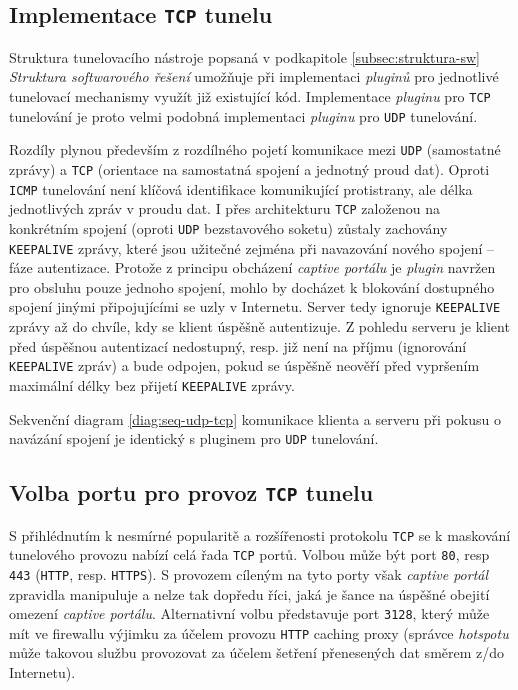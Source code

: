 \documentclass[thesis=M,czech]{FITthesis}[2012/10/20]
\begin{document}
    
    \subsection{Implementace \texttt{TCP} tunelu}
    
    Struktura tunelovacího nástroje popsaná v podkapitole \ref{subsec:struktura-sw} \textit{Struktura softwarového řešení} umožňuje při implementaci \textit{pluginů} pro jednotlivé tunelovací mechanismy využít již existující kód. Implementace \textit{pluginu} pro \texttt{TCP} tunelování je proto velmi podobná implementaci \textit{pluginu} pro \texttt{UDP} tunelování.
    
    Rozdíly plynou především z rozdílného pojetí komunikace mezi \texttt{UDP} (samostatné zprávy) a \texttt{TCP} (orientace na samostatná spojení a jednotný proud dat). Oproti \texttt{ICMP} tunelování není klíčová identifikace komunikující protistrany, ale délka jednotlivých zpráv v proudu dat. I přes architekturu \texttt{TCP} založenou na konkrétním spojení (oproti \texttt{UDP} bezstavového soketu) zůstaly zachovány \texttt{KEEPALIVE} zprávy, které jsou užitečné zejména při navazování nového spojení -- fáze autentizace. Protože z principu obcházení \textit{captive portálu} je \textit{plugin} navržen pro obsluhu pouze jednoho spojení, mohlo by docházet k blokování dostupného spojení jinými připojujícími se uzly v Internetu. Server tedy ignoruje \texttt{KEEPALIVE} zprávy až do chvíle, kdy se klient úspěšně autentizuje. Z pohledu serveru je klient před úspěšnou autentizací nedostupný, resp. již není na příjmu (ignorování \texttt{KEEPALIVE} zpráv) a bude odpojen, pokud se úspěšně neověří před vypršením maximální délky bez přijetí \texttt{KEEPALIVE} zprávy.
    
    Sekvenční diagram \ref{diag:seq-udp-tcp} komunikace klienta a serveru při pokusu o navázání spojení je identický s pluginem pro \texttt{UDP} tunelování.
    
    \subsection{Volba portu pro provoz \texttt{TCP} tunelu}
    
    S přihlédnutím k nesmírné popularitě a rozšířenosti protokolu \texttt{TCP} se k maskování tunelového provozu nabízí celá řada \texttt{TCP} portů. Volbou může být port \texttt{80}, resp \texttt{443} (\texttt{HTTP}, resp. \texttt{HTTPS}). S provozem cíleným na tyto porty však \textit{captive portál} zpravidla manipuluje a nelze tak dopředu říci, jaká je šance na úspěšné obejití omezení \textit{captive portálu}. Alternativní volbu představuje port \texttt{3128}, který může mít ve firewallu výjimku za účelem provozu \texttt{HTTP} caching proxy (správce \textit{hotspotu} může takovou službu provozovat za účelem šetření přenesených dat směrem z/do Internetu).
    
\end{document}
